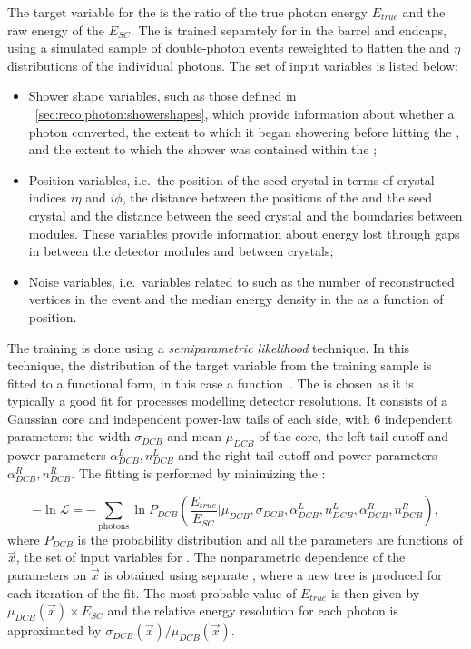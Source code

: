 The target variable for the \PhoEnergyBdt is the ratio of the true photon energy $E_{true}$ and the raw energy of the \SC $E_{SC}$. The \PhoEnergyBdt is trained separately for \SC\s in the barrel and endcaps, using a simulated sample of double-photon events reweighted to flatten the \pT and $\eta$ distributions of the individual photons. The set of input variables is listed below:
\begin{itemize}
\item Shower shape variables, such as those defined in \Sec~\ref{sec:reco:photon:showershapes}, which provide information about whether a photon converted, the extent to which it began showering before hitting the \ECAL, and the extent to which the shower was contained within the \ECAL;
\item Position variables, i.e.~the position of the seed crystal in terms of crystal indices $i\eta$ and $i\phi$, the distance between the positions of the \SC and the seed crystal and the distance between the seed crystal and the boundaries between \ECAL modules. These variables provide information about energy lost through gaps in between the detector modules and between crystals; 
\item Noise variables, i.e.~variables related to \PU such as the number of reconstructed vertices in the event and the median energy density in the \ECAL as a function of position.
\end{itemize}

The training is done using a \emph{semiparametric likelihood} technique. In this technique, the distribution of the target variable from the training sample is fitted to a functional form, in this case a \DCB function~\cite{CrystalBallFunction}. The \DCB is chosen as it is typically a good fit for processes modelling detector resolutions. It consists of a Gaussian core and independent power-law tails of each side, with 6 independent parameters: the width $\sigma_{DCB}$ and mean $\mu_{DCB}$ of the core, the left tail cutoff and power parameters $\alpha_{DCB}^{L},n_{DCB}^{L}$ and the right tail cutoff and power parameters $\alpha_{DCB}^{R},n_{DCB}^{R}$. The fitting is performed by minimizing the \NLL:

\begin{equation}
\label{reco:eq:regression:dcb}
 - \ln \mathcal{L} = - \sum_{\textrm{photons}} \ln P_{DCB}( \frac{E_{true}}{E_{SC}} | \mu_{DCB}, \sigma_{DCB}, \alpha_{DCB}^{L},n_{DCB}^{L}, \alpha_{DCB}^{R},n_{DCB}^{R} ) , 
\end{equation}
 where $P_{DCB}$ is the \DCB probability distribution and all the \DCB parameters are functions of $\vec{x}$, the set of input variables for \PhoEnergyBdt. The nonparametric dependence of the \DCB parameters on $\vec{x}$ is obtained using separate \BDT\s, where a new tree is produced for each iteration of the \NLL fit. The most probable value of $E_{true}$ is then given by $\mu_{DCB}(\vec{x}) \times E_{SC}$ and the relative energy resolution for each photon is approximated by $\sigma_{DCB}(\vec{x}) / \mu_{DCB}(\vec{x})$.

